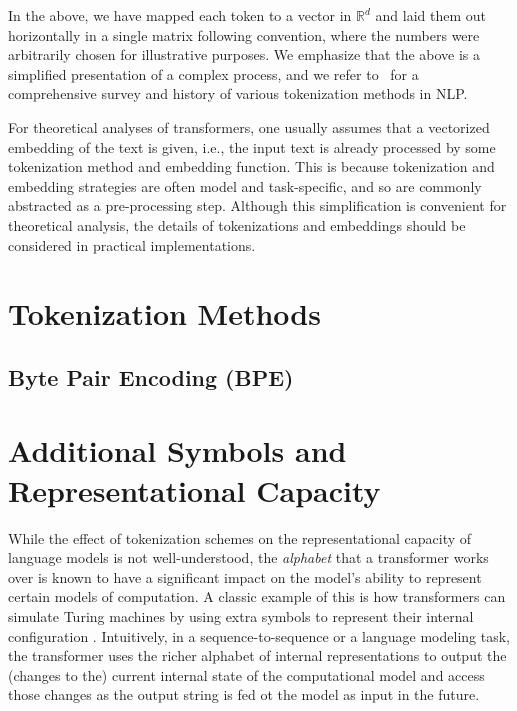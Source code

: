 In the above, we have mapped each token to a vector in \(\mathbb{R}^{d}\) and laid them out horizontally in a single matrix following convention, where the numbers were arbitrarily chosen for illustrative purposes.
We emphasize that the above is a simplified presentation of a complex process, and we refer to~\citep{mielke2021between} for a comprehensive survey and history of various tokenization methods in NLP.



For theoretical analyses of transformers, one usually assumes that a vectorized embedding of the text is given, i.e., the input text is already processed by some tokenization method and embedding function.
This is because tokenization and embedding strategies are often model and task-specific, and so are commonly abstracted as a pre-processing step.
Although this simplification is convenient for theoretical analysis, the details of tokenizations and embeddings should be considered in practical implementations.





\section{Tokenization Methods}

\subsection{Byte Pair Encoding (BPE)}


\section{Additional Symbols and Representational Capacity}

While the effect of tokenization schemes on the representational capacity of language models is not well-understood, the \emph{alphabet} that a transformer works over is known to have a significant impact on the model's ability to represent certain models of computation.
A classic example of this is how transformers can simulate Turing machines by using extra symbols to represent their internal configuration \citep{perez-etal-2021-turing}.
Intuitively, in a sequence-to-sequence or a language modeling task, the transformer uses the richer alphabet of internal representations to output the (changes to the) current internal state of the computational model and access those changes as the output string is fed ot the model as input in the future.


